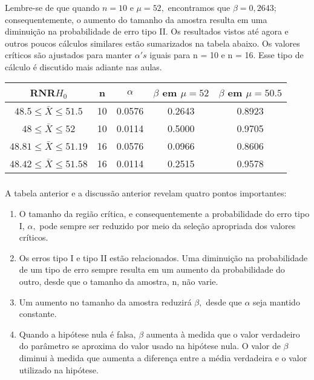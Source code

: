 \documentclass[14pt,aspectratio=1610]{beamer}
\newcommand{\Ho}{\ensuremath{H_{0}}}
\begin{document}
\begin{frame}{}
\frametitle{}
\begin{block}{}
\justifying
Lembre-se de que quando $n = 10$ e $\mu = 52,$ encontramos que $\beta = 0,2643;$ consequentemente, o aumento do tamanho da amostra resulta em uma diminuição 
na probabilidade de erro tipo II. Os resultados vistos até agora e outros poucos cálculos similares estão sumarizados na tabela abaixo. Os valores críticos são ajustados 
para manter $\alpha's$ iguais para n = 10 e n = 16. Esse tipo de cálculo é discutido mais adiante nas aulas.
\end{block}
\begin{table}[]
\begin{tabular}{|c|c|c|c|c|}
\hline
 RNR$\Ho$                                & n    & $\alpha$ & $\beta$ em $\mu=52$ & $\beta$ em $\mu=50.5$ \\ \hline
 $48.5\leq \bar{X}\leq 51.5$     & 10 & 0.0576 & 0.2643 & 0.8923 \\ \hline
 $48\leq \bar{X}\leq 52$           & 10 & 0.0114 & 0.5000 & 0.9705 \\ \hline
 $48.81\leq \bar{X}\leq 51.19$& 16 & 0.0576 & 0.0966 & 0.8606 \\ \hline
 $48.42\leq \bar{X}\leq 51.58$& 16 & 0.0114 & 0.2515 & 0.9578 \\ \hline
\end{tabular}
\end{table}

\end{frame}

\begin{frame}{}
\frametitle{}
\begin{block}{}
\justifying
A tabela anterior e a discussão anterior revelam quatro pontos importantes:
\begin{enumerate}
\item O tamanho da região crítica, e consequentemente a probabilidade do erro tipo I, $\alpha,$ pode sempre ser reduzido por meio da seleção apropriada dos valores 
críticos. \pause
\item Os erros tipo I e tipo II estão relacionados. Uma diminuição na probabilidade de um tipo de erro sempre resulta em um aumento da probabilidade do outro, desde 
que o tamanho da amostra, n, não varie. \pause
\item Um aumento no tamanho da amostra reduzirá $\beta,$ desde que $\alpha$ seja mantido constante. \pause
\item Quando a hipótese nula é falsa, $\beta$ aumenta à medida que o valor verdadeiro do parâmetro se aproxima do valor usado na hipótese nula. O valor de $\beta$ 
diminui à medida que aumenta a diferença entre a média verdadeira e o valor utilizado na hipótese.
\end{enumerate}
\end{block}
\end{frame}
\end{document}

